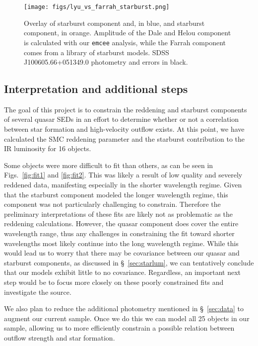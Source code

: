 \begin{figure}
  \centering
  \texttt{[image: figs/lyu\_vs\_farrah\_starburst.png]}
  \caption{Overlay of \cite{farrah2012} starburst component and, in blue, and \cite{dalehelou2002} starburst component, in orange. 
           Amplitude of the Dale and Helou component is calculated with our \texttt{emcee} analysis, while the Farrah component 
           comes from a library of starburst models. SDSS J100605.66+051349.0 photometry and errors in black.}
           \label{fig:lyuvsfarrah_starburst}
\end{figure}

\subsection{Interpretation and additional steps}
\label{sec:interp}

The goal of this project is to constrain the reddening and starburst components of several quasar SEDs in an effort to determine 
whether or not a correlation between star formation and high-velocity outflow exists. At this point, we have calculated the SMC 
reddening parameter and the starburst contribution to the IR luminosity for 16 objects. 

Some objects were more difficult to fit than others, as can be seen in Figs.~\ref{fig:fit1} and \ref{fig:fit2}. This was likely a 
result of low quality 
and severely reddened data, manifesting especially in the shorter wavelength regime. Given that the starburst component 
modeled the longer wavelength regime, this component was not particularly challenging to constrain. Therefore the preliminary 
interpretations of these fits are likely not as problematic as the reddening calculations. However, the quasar component 
does cover the entire wavelength range, thus any challenges in constraining the fit toward shorter wavelengths most 
likely continue into the long wavelength regime. While this would lead us to worry that there may be covariance between 
our quasar and starburst components, as discussed in \S~\ref{sec:starlum}, we can tentatively conclude that our models 
exhibit little to no covariance. Regardless, an important next step would be to focus more closely on these poorly constrained 
fits and investigate the source.
  
We also plan to reduce the additional photometry mentioned in \S~\ref{sec:data} to augment our current sample. Once we do 
this we can model all 25 objects in our sample, allowing us to more efficiently constrain a possible relation between 
outflow strength and star formation. 

